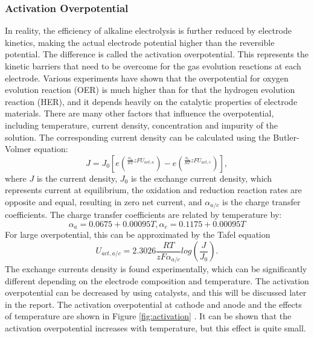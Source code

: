 \subsubsection{Activation Overpotential}
In reality, the efficiency of alkaline electrolysis is further reduced by electrode kinetics, making the actual electrode potential higher than the reversible potential. The difference is called the activation overpotential. This represents the kinetic barriers that need to be overcome for the gas evolution reactions at each electrode. Various experiments have shown that the overpotential for oxygen evolution reaction (OER) is much higher than for that the hydrogen evolution reaction (HER), and it depends heavily on the catalytic properties of electrode materials. \cite{activation} There are many other factors that influence the overpotential, including temperature, current density, concentration and impurity of the solution.
The corresponding current density can be calculated using the Butler-Volmer equation: \cite{activation1}
\begin{equation} 
J = J_0 [e(^{\frac{\alpha_a}{RT}zFU_{act,a}}) - e(^{\frac{\alpha_c}{RT}zFU_{act,c}})],
\end{equation}
where $J$ is the current density, $J_0$ is the exchange current density, which represents current at equilibrium, the oxidation and reduction reaction rates are opposite and equal, resulting in zero net current, and  $\alpha_{a/c}$ is the charge transfer coefficients. The charge transfer coefficients are related by temperature by:\cite{activation4}
\begin{equation} 
\alpha_a = 0.0675 + 0.00095T,   \alpha_c = 0.1175+0.00095T
\end{equation} 
For large overpotential, this can be approximated by the Tafel equation\cite{activation2} 
\begin{equation} 
U_{act,a/c} = 2.3026 \frac{RT}{zF\alpha_{a/c}} log(\frac{J}{J_0}).
\end{equation}
The exchange currents density is found experimentally, which can be significantly different depending on the electrode composition and temperature. The activation overpotential can be decreased by using catalysts, and this will be discussed later in the report. The activation overpotential at cathode and anode and the effects of temperature are shown in Figure \ref{fig:activation} . It can be shown that the activation overpotential increases with temperature, but this effect is quite small.
